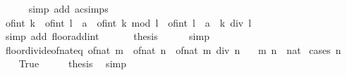 \begin{isabellebody}
\ \ \ \ \isamarkupfalse%
\ {\isacharparenleft}{\kern0pt}simp\ add{\isacharcolon}{\kern0pt}\ ac{\isacharunderscore}{\kern0pt}simps{\isacharparenright}{\kern0pt}\isanewline
\ \ \isamarkupfalse%
\ \isamarkupfalse%
\ {\isachardoublequoteopen}{\isasymlfloor}of{\isacharunderscore}{\kern0pt}int\ k\ {\isacharslash}{\kern0pt}\ of{\isacharunderscore}{\kern0pt}int\ l\ {\isacharcolon}{\kern0pt}{\isacharcolon}{\kern0pt}\ {\isacharprime}{\kern0pt}a{\isasymrfloor}\ {\isacharequal}{\kern0pt}\ {\isasymlfloor}of{\isacharunderscore}{\kern0pt}int\ {\isacharparenleft}{\kern0pt}k\ mod\ l{\isacharparenright}{\kern0pt}\ {\isacharslash}{\kern0pt}\ of{\isacharunderscore}{\kern0pt}int\ l\ {\isacharcolon}{\kern0pt}{\isacharcolon}{\kern0pt}\ {\isacharprime}{\kern0pt}a{\isasymrfloor}\ {\isacharplus}{\kern0pt}\ k\ div\ l{\isachardoublequoteclose}\isanewline
\ \ \ \ \isamarkupfalse%
\ {\isacharparenleft}{\kern0pt}simp\ add{\isacharcolon}{\kern0pt}\ floor{\isacharunderscore}{\kern0pt}add{\isacharunderscore}{\kern0pt}int{\isacharparenright}{\kern0pt}\isanewline
\ \ \isamarkupfalse%
\ {\isacharasterisk}{\kern0pt}\ \isamarkupfalse%
\ {\isacharquery}{\kern0pt}thesis\isanewline
\ \ \ \ \isamarkupfalse%
\ simp\isanewline
{}\isamarkupfalse%
%
\endisatagproof
{\isafoldproof}%
%
\isadelimproof
\isanewline
%
\endisadelimproof
\isanewline
{}\isamarkupfalse%
\ floor{\isacharunderscore}{\kern0pt}divide{\isacharunderscore}{\kern0pt}of{\isacharunderscore}{\kern0pt}nat{\isacharunderscore}{\kern0pt}eq{\isacharcolon}{\kern0pt}\ {\isachardoublequoteopen}{\isasymlfloor}of{\isacharunderscore}{\kern0pt}nat\ m\ {\isacharslash}{\kern0pt}\ of{\isacharunderscore}{\kern0pt}nat\ n{\isasymrfloor}\ {\isacharequal}{\kern0pt}\ of{\isacharunderscore}{\kern0pt}nat\ {\isacharparenleft}{\kern0pt}m\ div\ n{\isacharparenright}{\kern0pt}{\isachardoublequoteclose}\isanewline
\ \ \ m\ n\ {\isacharcolon}{\kern0pt}{\isacharcolon}{\kern0pt}\ nat\isanewline
%
\isadelimproof
%
\endisadelimproof
%
\isatagproof
{}\isamarkupfalse%
\ {\isacharparenleft}{\kern0pt}cases\ {\isachardoublequoteopen}n\ {\isacharequal}{\kern0pt}\ {}{\isachardoublequoteclose}{\isacharparenright}{\kern0pt}\isanewline
\ \ \isamarkupfalse%
\ True\isanewline
\ \ \isamarkupfalse%
\ \isamarkupfalse%
\ {\isacharquery}{\kern0pt}thesis\ \isamarkupfalse%
\ simp\isanewline
{}\isamarkupfalse%
\isanewline
\ \ \isamarkupfalse%

\end{isabellebody}
